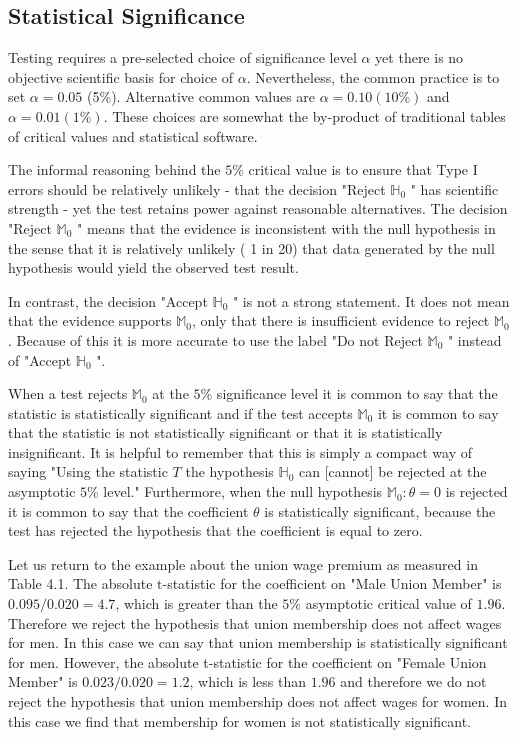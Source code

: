 \documentclass[10pt]{article}
\begin{document}
\subsection{Statistical Significance}
Testing requires a pre-selected choice of significance level $\alpha$ yet there is no objective scientific basis for choice of $\alpha$. Nevertheless, the common practice is to set $\alpha=0.05$ (5\%). Alternative common values are $\alpha=0.10(10 \%)$ and $\alpha=0.01(1 \%)$. These choices are somewhat the by-product of traditional tables of critical values and statistical software.

The informal reasoning behind the $5 \%$ critical value is to ensure that Type I errors should be relatively unlikely - that the decision "Reject $\mathbb{H}_{0}$ " has scientific strength - yet the test retains power against reasonable alternatives. The decision "Reject $\mathbb{M}_{0}$ " means that the evidence is inconsistent with the null hypothesis in the sense that it is relatively unlikely ( 1 in 20) that data generated by the null hypothesis would yield the observed test result.

In contrast, the decision "Accept $\mathbb{H}_{0}$ " is not a strong statement. It does not mean that the evidence supports $\mathbb{M}_{0}$, only that there is insufficient evidence to reject $\mathbb{M}_{0}$. Because of this it is more accurate to use the label "Do not Reject $\mathbb{M}_{0}$ " instead of "Accept $\mathbb{H}_{0}$ ".

When a test rejects $\mathbb{M}_{0}$ at the $5 \%$ significance level it is common to say that the statistic is statistically significant and if the test accepts $\mathbb{M}_{0}$ it is common to say that the statistic is not statistically significant or that it is statistically insignificant. It is helpful to remember that this is simply a compact way of saying "Using the statistic $T$ the hypothesis $\mathbb{H}_{0}$ can [cannot] be rejected at the asymptotic $5 \%$ level." Furthermore, when the null hypothesis $\mathbb{M}_{0}: \theta=0$ is rejected it is common to say that the coefficient $\theta$ is statistically significant, because the test has rejected the hypothesis that the coefficient is equal to zero.

Let us return to the example about the union wage premium as measured in Table 4.1. The absolute $\mathrm{t}$-statistic for the coefficient on "Male Union Member" is $0.095 / 0.020=4.7$, which is greater than the $5 \%$ asymptotic critical value of $1.96$. Therefore we reject the hypothesis that union membership does not affect wages for men. In this case we can say that union membership is statistically significant for men. However, the absolute t-statistic for the coefficient on "Female Union Member" is $0.023 / 0.020=1.2$, which is less than $1.96$ and therefore we do not reject the hypothesis that union membership does not affect wages for women. In this case we find that membership for women is not statistically significant.
\end{document}
